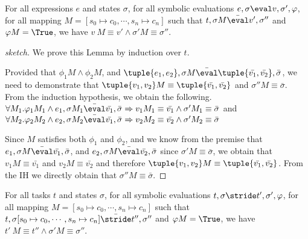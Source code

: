 \begin{lemma}
  \label{lem:soundeval}

  For all expressions $e$ and states $\sigma$,
  for all symbolic evaluations $e,\sigma\eval v,\sigma',\phi$,
  for all mapping $M=[s_0\mapsto c_0,\cdots,s_n\mapsto c_n]$
  such that $t,\sigma M \bar{\eval}v',\sigma''$ and $\phi M = \True$,
  we have $v\ M \equiv v' \wedge \sigma' M \equiv \sigma''$.

\end{lemma}

\begin{proof}[sketch]
  We prove this Lemma by induction over $t$.



Provided that $\phi_1 M\wedge\phi_2 M$, and $\tuple{e_1, e_2},\sigma M\bar{\eval}\tuple{\bar{v_1},\bar{v_2}},\bar{\sigma}$,
we need to demonstrate that $\tuple{v_1,v_2} M \equiv \tuple{\bar{v_1},\bar{v_2}}$ and $\sigma'' M\equiv\bar{\sigma}$.
From the induction hypothesis, we obtain the following. $\forall M_1 . \phi_1 M_1 \wedge e_1,\sigma M_1\bar{\eval}\bar{v_1},\bar{\sigma}\implies v_1 M_1\equiv \bar{v_1} \wedge \sigma' M_1\equiv\bar{\sigma}$ and
$\forall M_2 . \phi_2 M_2 \wedge e_2,\sigma M_2\bar{\eval}\bar{v_1},\bar{\sigma}\implies v_2 M_2\equiv \bar{v_2} \wedge \sigma' M_2\equiv\bar{\sigma}$

Since $M$ satisfies both $\phi_1$ and $\phi_2$, and we know from the premise that $e_1,\sigma M\bar{\eval}\bar{v_1},\bar{\sigma}$, and $e_2,\sigma M\bar{\eval}\bar{v_2},\bar{\sigma}$ since $\sigma' M \equiv \bar{\sigma}$, we obtain that $v_1 M\equiv \bar{v_1}$ and $v_2 M\equiv \bar{v_2}$ and therefore $\tuple{v_1,v_2} M \equiv \tuple{\bar{v_1},\bar{v_2}}$.
From the IH we directly obtain that $\sigma'' M\equiv\bar{\sigma}$.

\end{proof}

\begin{lemma}
  \label{lem:soundeval}

  For all tasks $t$ and states $\sigma$,
  for all symbolic evaluations $t,\sigma\stride t',\sigma',\phi$,
  for all mapping $M=[s_0\mapsto c_0,\cdots,s_n\mapsto c_n]$
  such that $t,\sigma [s_0\mapsto c_0,\cdots,s_n\mapsto c_n] \bar{\stride}t'',\sigma''$ and $\phi M = \True$,
  we have $t'\ M \equiv t'' \wedge \sigma' M \equiv \sigma''$.

\end{lemma}

